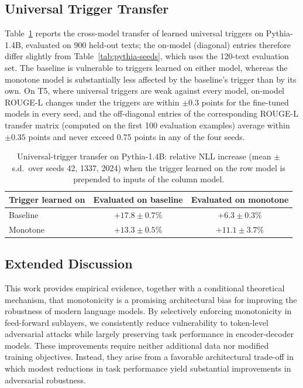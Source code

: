 \documentclass{article}
\theoremstyle{plain}
\theoremstyle{definition}
\theoremstyle{remark}
\theoremstyle{plain}
\begin{document}
\subsection{Universal Trigger Transfer}
\label{app:transfer}
Table~\ref{tab:uat-transfer} reports the cross-model transfer of learned universal triggers on Pythia-1.4B, evaluated on 900 held-out texts; the on-model (diagonal) entries therefore differ slightly from Table~\ref{tab:pythia-seeds}, which uses the 120-text evaluation set. The baseline is vulnerable to triggers learned on either model, whereas the monotone model is substantially less affected by the baseline's trigger than by its own. On T5, where universal triggers are weak against every model, on-model ROUGE-L changes under the triggers are within $\pm 0.3$ points for the fine-tuned models in every seed, and the off-diagonal entries of the corresponding ROUGE-L transfer matrix (computed on the first 100 evaluation examples) average within $\pm 0.35$ points and never exceed 0.75 points in any of the four seeds.

\begin{table}[h]
\caption{Universal-trigger transfer on Pythia-1.4B: relative NLL increase (mean $\pm$ s.d.\ over seeds 42, 1337, 2024) when the trigger learned on the row model is prepended to inputs of the column model.}
\label{tab:uat-transfer}
\vskip 0.1in
\begin{center}
\begin{small}
\begin{tabular}{lcc}
\toprule
Trigger learned on & Evaluated on baseline & Evaluated on monotone \\
\midrule
Baseline & $+17.8 \pm 0.7\%$ & $+6.3 \pm 0.3\%$ \\
Monotone & $+13.3 \pm 0.5\%$ & $+11.1 \pm 3.7\%$ \\
\bottomrule
\end{tabular}
\end{small}
\end{center}
\vskip -0.1in
\end{table}


\subsection{Extended Discussion}
\label{app:discussion}

This work provides empirical evidence, together with a conditional theoretical mechanism, that monotonicity is a promising architectural bias
for improving the robustness of modern language models. By selectively enforcing monotonicity in feed-forward sublayers, we consistently reduce vulnerability to token-level adversarial attacks while largely preserving task performance in encoder-decoder models.
These improvements require neither additional data nor
modified training objectives. Instead, they arise from a
favorable architectural trade-off in which modest reductions in
task performance yield substantial improvements in adversarial
robustness.
\end{document}
